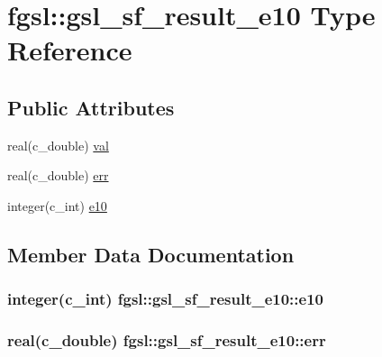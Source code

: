 \hypertarget{structfgsl_1_1gsl__sf__result__e10}{}\section{fgsl\+:\+:gsl\+\_\+sf\+\_\+result\+\_\+e10 Type Reference}
\label{structfgsl_1_1gsl__sf__result__e10}
\subsection*{Public Attributes}
\begin{DoxyCompactItemize}
\item 
real(c\+\_\+double) \hyperlink{structfgsl_1_1gsl__sf__result__e10_acb74f78fcd7f067d10432958045ebe8b}{val}
\item 
real(c\+\_\+double) \hyperlink{structfgsl_1_1gsl__sf__result__e10_a245eaaf8dd79ae30494173be913e4c69}{err}
\item 
integer(c\+\_\+int) \hyperlink{structfgsl_1_1gsl__sf__result__e10_aced4fab828ae664ee5aa475fa8a713d6}{e10}
\end{DoxyCompactItemize}


\subsection{Member Data Documentation}
\hypertarget{structfgsl_1_1gsl__sf__result__e10_aced4fab828ae664ee5aa475fa8a713d6}{}
\subsubsection[{e10}]{\setlength{\rightskip}{0pt plus 5cm}integer(c\+\_\+int) fgsl\+::gsl\+\_\+sf\+\_\+result\+\_\+e10\+::e10}\label{structfgsl_1_1gsl__sf__result__e10_aced4fab828ae664ee5aa475fa8a713d6}
\hypertarget{structfgsl_1_1gsl__sf__result__e10_a245eaaf8dd79ae30494173be913e4c69}{}
\subsubsection[{err}]{\setlength{\rightskip}{0pt plus 5cm}real(c\+\_\+double) fgsl\+::gsl\+\_\+sf\+\_\+result\+\_\+e10\+::err}\label{structfgsl_1_1gsl__sf__result__e10_a245eaaf8dd79ae30494173be913e4c69}
\hypertarget{structfgsl_1_1gsl__sf__result__e10_acb74f78fcd7f067d10432958045ebe8b}{}
